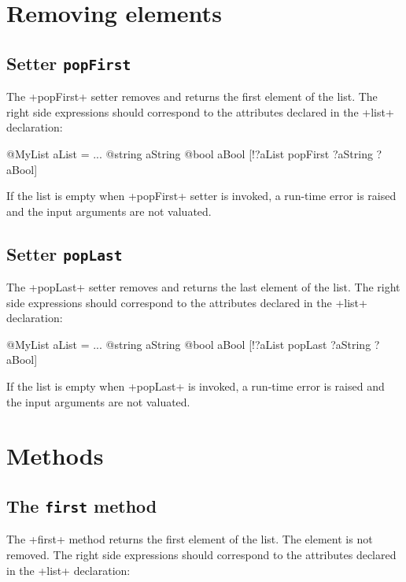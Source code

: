 \section{Removing elements}

\subsection{Setter \texttt{popFirst}}


The \ggst+popFirst+ setter removes and returns the first element of the list. The right side expressions should correspond to the attributes declared in the \ggst+list+ declaration:

\begin{galgas3}
@MyList aList = ...
@string aString
@bool aBool
[!?aList popFirst ?aString ?aBool]
\end{galgas3}

If the list is empty when \ggst+popFirst+ setter is invoked, a run-time error is raised and the input arguments are not valuated.

\subsection{Setter \texttt{popLast}}


The \ggst+popLast+ setter removes and returns the last element of the list. The right side expressions should correspond to the attributes declared in the \ggst+list+ declaration:

\begin{galgas3}
@MyList aList = ...
@string aString
@bool aBool
[!?aList popLast ?aString ?aBool]
\end{galgas3}

If the list is empty when \ggst+popLast+ is invoked, a run-time error is raised and the input arguments are not valuated.

\section{Methods}

\subsection{The \texttt{first} method}

The \ggst+first+ method returns the first element of the list. The element is not removed. The right side expressions should correspond to the attributes declared in the \ggst+list+ declaration:

